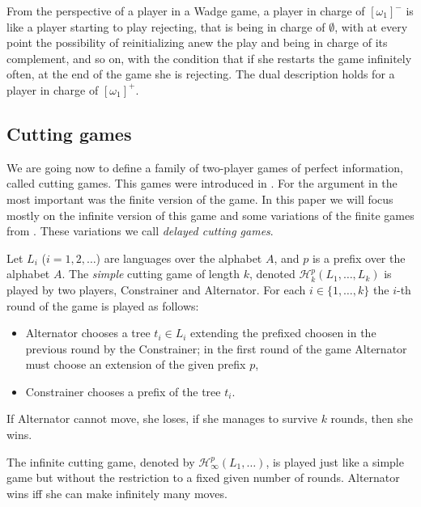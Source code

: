 From the perspective of a player in a Wadge game, a player in charge of $[\omega_1]^-$ is like a player starting to play rejecting, that is being in charge of $\emptyset$, with at every point the possibility of reinitializing anew the play and being in charge of its complement, and so on, with the condition that if she restarts the game infinitely often, at the end of the game she is rejecting. 
The dual description holds for a player in charge of $[\omega_1]^+$.



\subsection{Cutting games}

\label{cuttinggames}
We are going now to define a family of two-player games of perfect information, called cutting games. This games were
introduced in \cite{bp}. For the argument in \cite{bp} the most important was the finite version of the game. In this paper 
we will focus mostly on the infinite version of this game and some variations of the finite games from \cite{bp}. These variations we call \emph{delayed cutting games}. 

Let $L_i$ ($i=1,2,\dots$) are languages over the alphabet $A$, and $p$ is a prefix over the alphabet $A$. 
The \emph{simple} cutting game of length $k$, denoted $\mathcal{H}^p_k(L_1,\ldots,L_k)$ is played by two players, Constrainer and Alternator. 
For each $i \in \{1, \dots, k \}$ the $i$-th round of the game is played as follows:
\begin{itemize}
\item Alternator chooses a tree $t_i \in L_i$ extending the prefixed choosen in the previous round by the Constrainer; in the first round of the game Alternator must choose an extension of the given prefix $p$,
\item Constrainer chooses a prefix of the tree $t_i$.
\end{itemize}
If Alternator cannot move, she loses, if she manages to survive $k$ rounds, then she wins.

The infinite cutting game, denoted by $\mathcal{H}^p_\infty(L_1,\dots)$, is played just like a simple game but without the restriction to a fixed given number of rounds. Alternator wins iff she can make infinitely many moves.

